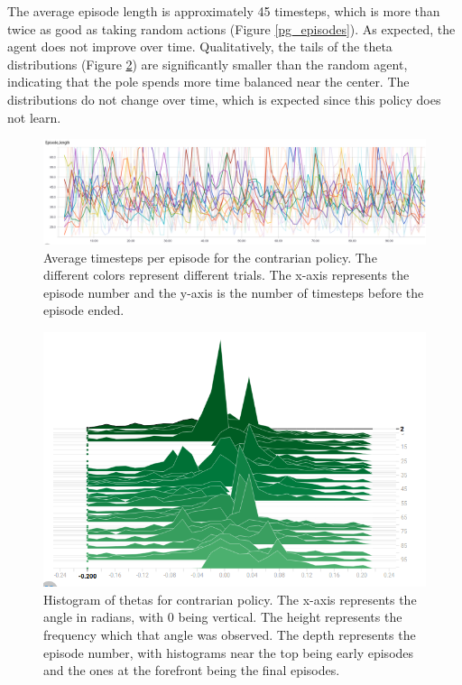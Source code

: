 \documentclass[12pt,a4paper]{article}
\begin{document}
The average episode length is approximately 45 timesteps, which is more than twice as good as taking random actions (Figure \ref{pg_episodes}). As expected, the agent does not improve over time.  Qualitatively, the tails of the theta distributions (Figure \ref{contrarian_thetas}) are significantly smaller than the random agent, indicating that the pole spends more time balanced near the center. The distributions do not change over time, which is expected since this policy does not learn. 

\begin{figure}[htbp]
\begin{center}
\includegraphics[width=\linewidth]{contrarian_lengths.png}
\caption{Average timesteps per episode for the contrarian policy. The different colors represent different trials. The x-axis represents the episode number and the y-axis is the number of timesteps before the episode ended. }
\label{contrarian_lengths}
\end{center}
\end{figure}

\begin{figure}[htbp]
\begin{center}
\includegraphics[width=\linewidth]{contrarian_thetas.png}
\caption{Histogram of thetas for contrarian policy. The x-axis represents the angle in radians, with 0 being vertical. The height represents the frequency which that angle was observed. The depth represents the episode number, with histograms near the top being early episodes and the ones at the forefront being the final episodes.}
\label{contrarian_thetas}
\end{center}
\end{figure}
\end{document}
